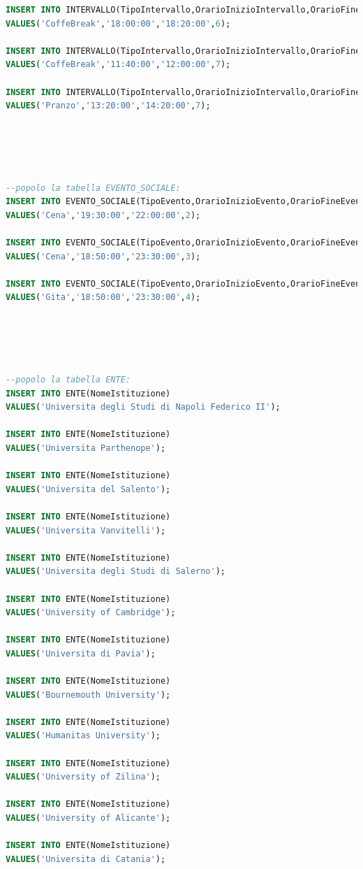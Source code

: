 \documentclass[a4page]{article}
\begin{document}
\begin{lstlisting}[language=SQL,
        deletekeywords={IDENTITY,INT},
        morekeywords={clustered},    
        framesep=10pt,
        framextopmargin=10pt]
INSERT INTO INTERVALLO(TipoIntervallo,OrarioInizioIntervallo,OrarioFineIntervallo,CodProgramma)
VALUES('CoffeBreak','18:00:00','18:20:00',6);

INSERT INTO INTERVALLO(TipoIntervallo,OrarioInizioIntervallo,OrarioFineIntervallo,CodProgramma)
VALUES('CoffeBreak','11:40:00','12:00:00',7);

INSERT INTO INTERVALLO(TipoIntervallo,OrarioInizioIntervallo,OrarioFineIntervallo,CodProgramma)
VALUES('Pranzo','13:20:00','14:20:00',7);





--popolo la tabella EVENTO_SOCIALE:
INSERT INTO EVENTO_SOCIALE(TipoEvento,OrarioInizioEvento,OrarioFineEvento,CodProgramma)
VALUES('Cena','19:30:00','22:00:00',2);

INSERT INTO EVENTO_SOCIALE(TipoEvento,OrarioInizioEvento,OrarioFineEvento,CodProgramma)
VALUES('Cena','18:50:00','23:30:00',3);

INSERT INTO EVENTO_SOCIALE(TipoEvento,OrarioInizioEvento,OrarioFineEvento,CodProgramma)
VALUES('Gita','18:50:00','23:30:00',4);





--popolo la tabella ENTE:
INSERT INTO ENTE(NomeIstituzione)
VALUES('Universita degli Studi di Napoli Federico II');

INSERT INTO ENTE(NomeIstituzione)
VALUES('Universita Parthenope');

INSERT INTO ENTE(NomeIstituzione)
VALUES('Universita del Salento');

INSERT INTO ENTE(NomeIstituzione)
VALUES('Universita Vanvitelli');

INSERT INTO ENTE(NomeIstituzione)
VALUES('Universita degli Studi di Salerno');

INSERT INTO ENTE(NomeIstituzione)
VALUES('University of Cambridge');

INSERT INTO ENTE(NomeIstituzione)
VALUES('Universita di Pavia');

INSERT INTO ENTE(NomeIstituzione)
VALUES('Bournemouth University');

INSERT INTO ENTE(NomeIstituzione)
VALUES('Humanitas University');

INSERT INTO ENTE(NomeIstituzione)
VALUES('University of Zilina');

INSERT INTO ENTE(NomeIstituzione)
VALUES('University of Alicante');

INSERT INTO ENTE(NomeIstituzione)
VALUES('Universita di Catania');






\end{lstlisting}
\end{document}
